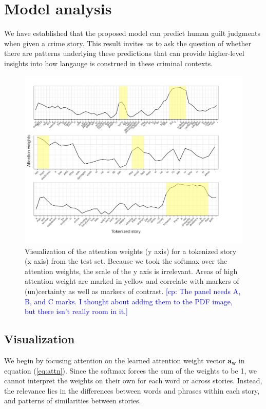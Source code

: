 \documentclass[11pt,a4paper]{article}
\newcommand{\cp}[1]{\textcolor{Blue}{[cp: #1]}}
\begin{document}
\section{Model analysis}

We have established that the proposed model can predict human guilt judgments when given a crime story. This result invites us to ask the question of whether there are patterns underlying these predictions that can provide higher-level insights into how langauge is construed in these criminal contexts. 

\begin{figure}[t]
  \centering
  \includegraphics[width=1\linewidth]{graphs/attention-marked.pdf}
  \caption{Visualization of the attention weights (y axis) for a tokenized story (x axis) from the test set. Because we took the softmax over the attention weights, the scale of the y axis is irrelevant. Areas of high attention weight are marked in yellow and correlate with markers of (un)certainty as well as markers of contrast. \cp{The panel needs A, B, and C marks. I thought about adding them to the PDF image, but there isn't really room in it.}}
  \label{fig:viz}
\end{figure}

\subsection{Visualization}

We begin by focusing attention on the learned attention weight vector $\mathbf{a_{w}}$ in equation (\ref{eq:attn}). Since the softmax forces the sum of the weights to be 1, we cannot interpret the weights on their own for each word or across stories. Instead, the relevance lies in the differences between words and phrases within each story, and patterns of similarities between stories.
\end{document}
